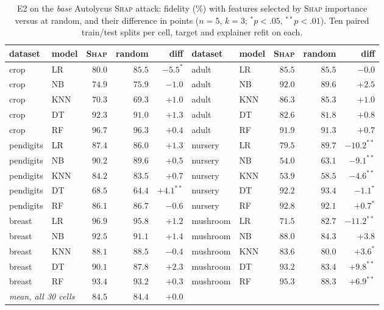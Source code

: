 \documentclass[sigconf,anonymous,review]{acmart}
\begin{document}
\begin{table}[t]
\centering
\caption{E2 on the \emph{base} Autolycus \textsc{Shap} attack: fidelity (\%) with features selected by
\textsc{Shap} importance versus at random, and their difference in points ($n{=}5$, $k{=}3$;
$^{*}p{<}.05$, $^{**}p{<}.01$). Ten paired train/test splits per cell, target and explainer refit on
each.}
\label{tab:shap-attr}
\begin{tabular}{llrrr@{\hskip 2em}llrrr}
\toprule
dataset & model & \textsc{Shap} & random & diff & dataset & model & \textsc{Shap} & random & diff \\
\midrule
crop & LR & $80.0$ & $85.5$ & $-5.5^{*}$  & adult & LR & $85.5$ & $85.5$ & $-0.0$ \\
crop & NB & $74.9$ & $75.9$ & $-1.0$  & adult & NB & $92.0$ & $89.6$ & $+2.5$ \\
crop & KNN & $70.3$ & $69.3$ & $+1.0$  & adult & KNN & $86.3$ & $85.3$ & $+1.0$ \\
crop & DT & $92.3$ & $91.0$ & $+1.3$  & adult & DT & $82.6$ & $81.8$ & $+0.8$ \\
crop & RF & $96.7$ & $96.3$ & $+0.4$  & adult & RF & $91.9$ & $91.3$ & $+0.7$ \\
pendigits & LR & $87.4$ & $86.0$ & $+1.3$  & nursery & LR & $79.5$ & $89.7$ & $-10.2^{**}$ \\
pendigits & NB & $90.2$ & $89.6$ & $+0.5$  & nursery & NB & $54.0$ & $63.1$ & $-9.1^{**}$ \\
pendigits & KNN & $84.2$ & $83.5$ & $+0.7$  & nursery & KNN & $53.9$ & $58.5$ & $-4.6^{**}$ \\
pendigits & DT & $68.5$ & $64.4$ & $+4.1^{**}$  & nursery & DT & $92.2$ & $93.4$ & $-1.1^{*}$ \\
pendigits & RF & $86.1$ & $86.7$ & $-0.6$  & nursery & RF & $92.8$ & $92.1$ & $+0.7^{*}$ \\
breast & LR & $96.9$ & $95.8$ & $+1.2$  & mushroom & LR & $71.5$ & $82.7$ & $-11.2^{**}$ \\
breast & NB & $92.5$ & $91.1$ & $+1.4$  & mushroom & NB & $88.0$ & $84.3$ & $+3.8$ \\
breast & KNN & $88.1$ & $88.5$ & $-0.4$  & mushroom & KNN & $83.6$ & $80.0$ & $+3.6^{*}$ \\
breast & DT & $90.1$ & $87.8$ & $+2.3$  & mushroom & DT & $93.2$ & $83.4$ & $+9.8^{**}$ \\
breast & RF & $93.4$ & $93.2$ & $+0.3$  & mushroom & RF & $95.3$ & $88.3$ & $+6.9^{**}$ \\
\midrule
\multicolumn{2}{l}{\emph{mean, all 30 cells}} & $84.5$ & $84.4$ & $+0.0$ & & & & & \\
\bottomrule
\end{tabular}
\end{table}
\end{document}
